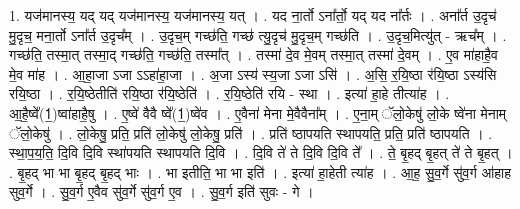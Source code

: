 \documentclass[17pt]{extarticle}
\begin{document}
1. यज॑मानस्य॒ यद् यद् यज॑मानस्य॒ यज॑मानस्य॒ यत् । . यद ना॒र्तो ऽना᳚र्तो॒ यद् यद ना᳚र्तः । . अना᳚र्त उ॒दृच॑ मु॒दृच॒ मना॒र्तो ऽना᳚र्त उ॒दृच᳚म् । . उ॒दृच॒म् गच्छ॑ति॒ गच्छ॑ त्यु॒दृच॑ मु॒दृच॒म् गच्छ॑ति । . उ॒दृच॒मित्यु॑त् - ऋच᳚म् । . गच्छ॑ति॒ तस्मा॒त् तस्मा॒द् गच्छ॑ति॒ गच्छ॑ति॒ तस्मा᳚त् । . तस्मा॑ दे॒व मे॒वम् तस्मा॒त् तस्मा॑ दे॒वम् । . ए॒व मा॑हाहै॒व मे॒व मा॑ह । . आ॒हा॒जा ऽजा ऽऽहा॑हा॒जा । . अ॒जा ऽस्य॑ स्य॒जा ऽजा ऽसि॑ । . अ॒सि॒ र॒यि॒ष्ठा र॑यि॒ष्ठा ऽस्य॑सि रयि॒ष्ठा । . र॒यि॒ष्ठेतीति॑ रयि॒ष्ठा र॑यि॒ष्ठेति॑ । . र॒यि॒ष्ठेति॑ रयि - स्था । . इत्या॑ हा॒हे तीत्या॑ह । . आ॒है॒ष्वे᳚(1॒)ष्वा॑हाहै॒षु । . ए॒ष्वे॑ वैवै ष्वे᳚(1॒)ष्वे॑व । . ए॒वैना॑ मेना मे॒वैवैना᳚म् । . ए॒ना॒म् ॅलो॒केषु॑ लो॒के ष्वे॑ना मेनाम् ॅलो॒केषु॑ । . लो॒केषु॒ प्रति॒ प्रति॑ लो॒केषु॑ लो॒केषु॒ प्रति॑ । . प्रति॑ ष्ठापयति स्थापयति॒ प्रति॒ प्रति॑ ष्ठापयति । . स्था॒प॒य॒ति॒ दि॒वि दि॒वि स्था॑पयति स्थापयति दि॒वि । . दि॒वि ते॑ ते दि॒वि दि॒वि ते᳚ । . ते॒ बृ॒हद् बृ॒हत् ते॑ ते बृ॒हत् । . बृ॒हद् भा भा बृ॒हद् बृ॒हद् भाः । . भा इतीति॒ भा भा इति॑ । . इत्या॑ हा॒हेती त्या॑ह । . आ॒ह॒ सु॒व॒र्गे सु॑व॒र्ग आ॑हाह सुव॒र्गे । . सु॒व॒र्ग ए॒वैव सु॑व॒र्गे सु॑व॒र्ग ए॒व । . सु॒व॒र्ग इति॑ सुवः - गे । \newline
\end{document}
